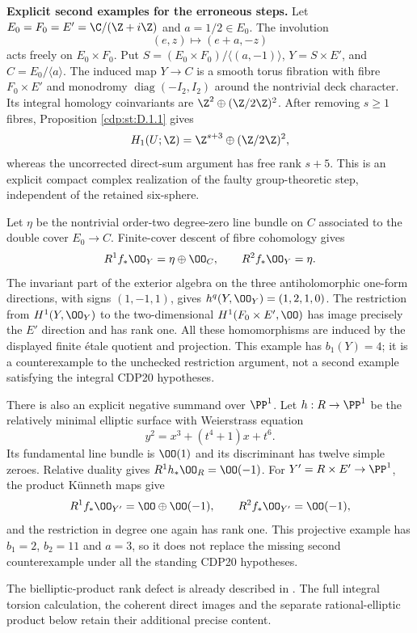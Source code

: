 
\begin{proposition}[Refuted]\label{cdp:st:D.1.5}

\textbf{Explicit second examples for the erroneous steps.}
Let $E_0=F_0=E'=\C/(\Z+i\Z)$ and $a=1/2\in E_0$.
The involution
\[
(e,z)\longmapsto(e+a,-z)
\]
acts freely on $E_0\times F_0$. Put
$S=(E_0\times F_0)/\langle(a,-1)\rangle$,
$Y=S\times E'$, and $C=E_0/\langle a\rangle$.
The induced map $Y\to C$ is a smooth torus fibration with fibre
$F_0\times E'$ and monodromy
$\operatorname{diag}(-I_2,I_2)$ around the nontrivial deck character.
Its integral homology coinvariants are
$\Z^2\oplus(\Z/2\Z)^2$. After removing $s\geq1$ fibres,
Proposition \ref{cdp:st:D.1.1} gives
\[
H_1(U;\Z)=\Z^{s+3}\oplus(\Z/2\Z)^2,
\]
whereas the uncorrected direct-sum argument has free rank $s+5$.
This is an explicit compact complex realization of the faulty
group-theoretic step, independent of the retained six-sphere.

Let $\eta$ be the nontrivial order-two degree-zero line bundle on
$C$ associated to the double cover $E_0\to C$. Finite-cover descent
of fibre cohomology gives
\[
R^1f_*\OO_Y=\eta\oplus\OO_C,\qquad R^2f_*\OO_Y=\eta.
\]
The invariant part of the exterior algebra on the three
antiholomorphic one-form directions, with signs $(1,-1,1)$,
gives $h^q(Y,\OO_Y)=(1,2,1,0)$. The restriction from
$H^1(Y,\OO_Y)$ to the two-dimensional $H^1(F_0\times E',\OO)$
has image precisely the $E'$ direction and has rank one.
All these homomorphisms are induced by the displayed finite
\'etale quotient and projection. This example has $b_1(Y)=4$;
it is a counterexample to the unchecked restriction argument, not
a second example satisfying the integral CDP20 hypotheses.

There is also an explicit negative summand over $\PP^1$. Let
$h:R\to\PP^1$ be the relatively minimal elliptic surface with
Weierstrass equation
\[
y^2=x^3+(t^4+1)x+t^6.
\]
Its fundamental line bundle is $\OO(1)$ and its discriminant has
twelve simple zeroes. Relative duality gives
$R^1h_*\OO_R=\OO(-1)$. For $Y'=R\times E'\to\PP^1$,
the product K\"unneth maps give
\[
R^1f_*\OO_{Y'}=\OO\oplus\OO(-1),\qquad
R^2f_*\OO_{Y'}=\OO(-1),
\]
and the restriction in degree one again has rank one. This
projective example has $b_1=2$, $b_2=11$ and $a=3$, so it does not
replace the missing second counterexample under all the standing
CDP20 hypotheses.
\end{proposition}

The bielliptic-product rank defect is already described in \citet[Section~10.5, p.~91]{AC2026}. The full integral torsion calculation, the coherent direct images and the separate rational-elliptic product below retain their additional precise content.



